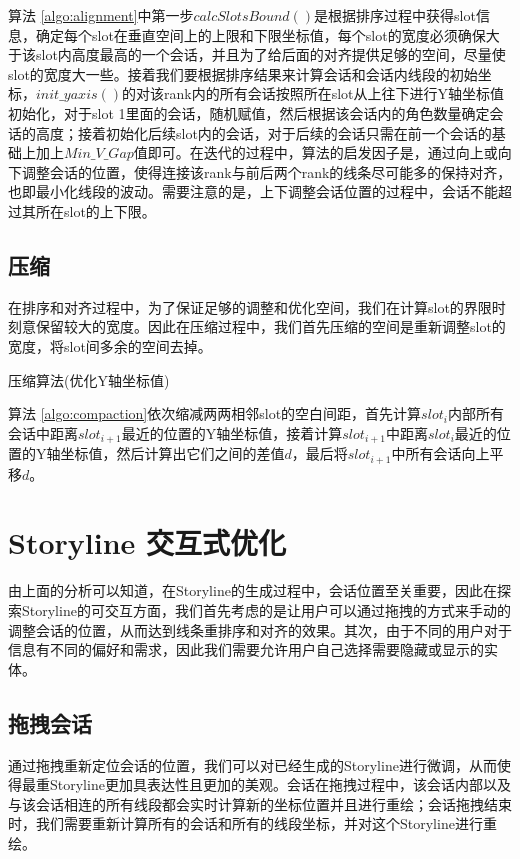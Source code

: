 算法 \ref{algo:alignment}中第一步$calcSlotsBound()$是根据排序过程中获得slot信息，确定每个slot在垂直空间上的上限和下限坐标值，每个slot的宽度必须确保大于该slot内高度最高的一个会话，并且为了给后面的对齐提供足够的空间，尽量使slot的宽度大一些。接着我们要根据排序结果来计算会话和会话内线段的初始坐标，$init\_yaxis()$的对该rank内的所有会话按照所在slot从上往下进行Y轴坐标值初始化，对于slot 1里面的会话，随机赋值，然后根据该会话内的角色数量确定会话的高度；接着初始化后续slot内的会话，对于后续的会话只需在前一个会话的基础上加上$Min\_V\_Gap$值即可。在迭代的过程中，算法的启发因子是，通过向上或向下调整会话的位置，使得连接该rank与前后两个rank的线条尽可能多的保持对齐，也即最小化线段的波动。需要注意的是，上下调整会话位置的过程中，会话不能超过其所在slot的上下限。

\subsection{压缩} 
在排序和对齐过程中，为了保证足够的调整和优化空间，我们在计算slot的界限时刻意保留较大的宽度。因此在压缩过程中，我们首先压缩的空间是重新调整slot的宽度，将slot间多余的空间去掉。
\begin{algorithm}[!htb]
  \caption{压缩算法(优化Y轴坐标值)}
  \label{algo:compaction}
\end{algorithm}
算法 \ref{algo:compaction}依次缩减两两相邻slot的空白间距，首先计算$slot_i$内部所有会话中距离$slot_{i+1}$最近的位置的Y轴坐标值，接着计算$slot_{i+1}$中距离$slot_i$最近的位置的Y轴坐标值，然后计算出它们之间的差值$d$，最后将$slot_{i+1}$中所有会话向上平移$d$。

\section{Storyline 交互式优化}
由上面的分析可以知道，在Storyline的生成过程中，会话位置至关重要，因此在探索Storyline的可交互方面，我们首先考虑的是让用户可以通过拖拽的方式来手动的调整会话的位置，从而达到线条重排序和对齐的效果。其次，由于不同的用户对于信息有不同的偏好和需求，因此我们需要允许用户自己选择需要隐藏或显示的实体。
\subsection{拖拽会话}
通过拖拽重新定位会话的位置，我们可以对已经生成的Storyline进行微调，从而使得最重Storyline更加具表达性且更加的美观。会话在拖拽过程中，该会话内部以及与该会话相连的所有线段都会实时计算新的坐标位置并且进行重绘；会话拖拽结束时，我们需要重新计算所有的会话和所有的线段坐标，并对这个Storyline进行重绘。

